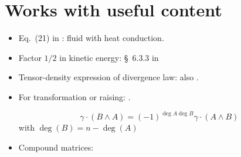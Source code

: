 \documentclass[a4paper,12pt,%
onecolumn,oneside,article,%
british%
]{memoir}
\theoremstyle{remark}
\theoremstyle{innote}
\renewcommand*{\finalnamedelim}{\addspace\amp\space}
\newcommand*{\amp}{\&}
\renewcommand*{\|}[1][]{\nonscript\:#1\vert\nonscript\:\mathopen{}}
\newcommand*{\sect}{\S}%
\newcommand*{\eqn}{eq.}%
\begin{document}
\section{Works with useful content}
\label{sec:works}

\begin{itemize}
\item Eq.~(21) in \cites{maugin1974b}: fluid with heat conduction.
\item Factor $1/2$ in kinetic energy: \sect~6.3.3 in \cites{gourgoulhon2007_r2012}

\item Tensor-density expression of divergence law:  \cites{castrillonlopezetal2008} also  \cites{kopeikinetal2011,soffeletal2019}.

\item For transformation or raising:  \cites[\sect~I.4 \eqn~(33)]{gantmacher1959_r2000}.

\begin{equation}
  \gamma\cdot (B\land A) = (-1)^{\deg{A}\deg{B}} \gamma\cdot(A \land B)
\end{equation}
with $\deg(B) = n-\deg(A)$
\cites[prop.~4.1]{barnabeietal1985}


\item Compound matrices:  \cites[\sect~IV.A.1 p.~199, Problem~1 p.~270]{choquetbruhatetal1977_r1996}
\end{itemize}

\renewcommand*{\finalnamedelim}{\addcomma\space}

\printbibliography[prenote=prenote%
]
\end{document}
